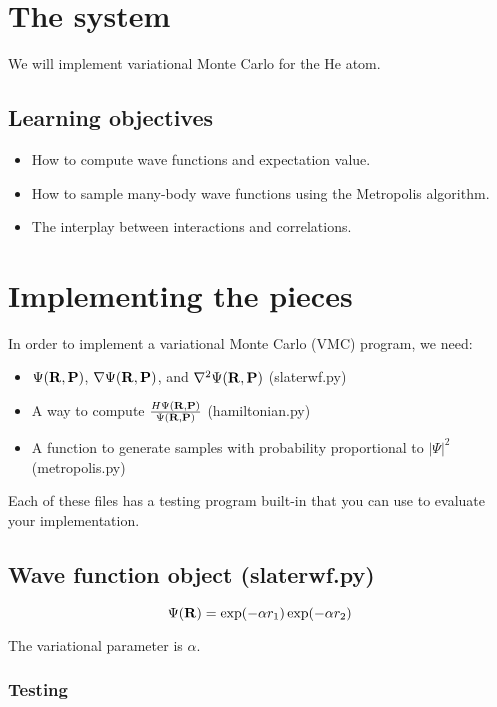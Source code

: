 \documentclass[12pt]{article}
\newcommand{\bR}{{\bf R}}
\newcommand{\bP}{{\bf P}}
\begin{document}
\section{The system} 

We will implement variational Monte Carlo for the He atom. 

\subsection{Learning objectives}
\begin{itemize}
\item How to compute wave functions and expectation value.
\item How to sample many-body wave functions using the Metropolis algorithm.
\item The interplay between interactions and correlations. 
\end{itemize}


\section{Implementing the pieces}

In order to implement a variational Monte Carlo (VMC) program, we need:
\begin{itemize}
	\item $\Psi(\bR,\bP)$, $\nabla \Psi(\bR,\bP)$, and $\nabla^2 \Psi(\bR,\bP)$ (slaterwf.py)
	\item A way to compute $\frac{H\Psi(\bR,\bP)}{\Psi(\bR,\bP)}$ (hamiltonian.py)
	\item A function to generate samples with probability proportional to $|\Psi|^2$ (metropolis.py)
\end{itemize}

Each of these files has a testing program built-in that you can use to evaluate your implementation.

\subsection{Wave function object (slaterwf.py)}

\begin{equation}
\Psi(\bR)=\exp(-\alpha r_1) \exp(-\alpha r_2)	
\end{equation}

The variational parameter is $\alpha$.

\subsubsection{Testing}
\end{document}
